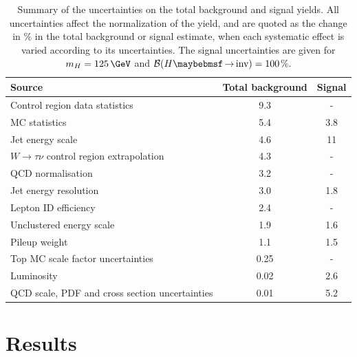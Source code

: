 \begin{table}[!htb]
\centering
\begin{tabular}{|l|c|c|}
\hline 
Source                                            & Total background &     Signal \\
\hline\hline
Control region data statistics                     &            9.3  &          - \\
MC statistics                                      &            5.4  &        3.8 \\
Jet energy scale                                   &            4.6  &         11 \\
$W\rightarrow\tau\nu$ control region extrapolation &            4.3  &          - \\
QCD normalisation                                  &            3.2  &          - \\
Jet energy resolution                              &            3.0  &        1.8 \\
Lepton ID efficiency                               &            2.4  &          - \\
Unclustered energy scale                           &            1.9  &        1.6 \\
Pileup weight                                      &            1.1  &        1.5 \\
Top MC scale factor uncertainties                  &            0.25 &          - \\
Luminosity                                         &            0.02 &        2.6 \\
QCD scale, PDF and cross section uncertainties     &            0.01 &        5.2 \\
\hline
\end{tabular}
\caption{Summary of the uncertainties on the total background and signal yields. All uncertainties affect the normalization of the yield, and are quoted as the change in \% in the total background or signal estimate, when each systematic effect is varied according to its uncertainties. The signal uncertainties are given for $m_H=125\,\GeV$ and $\BRinv=100$\%. \cite{ARTICLE:CMSVBFHiggsInvisibleParkedAnalysisPAS}}
\label{TABLE:ParkedDataAnalysis_Systematics_Summary}
\end{table}

\section{Results}

